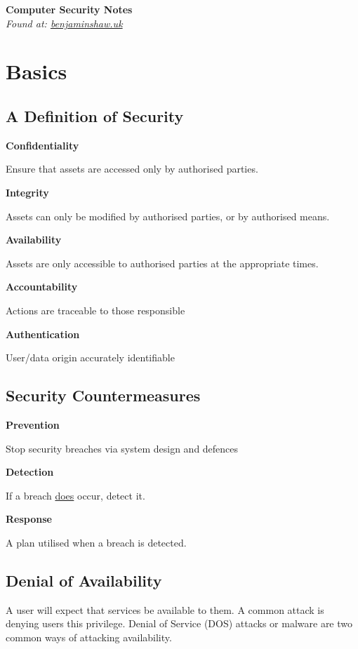 \documentclass{article}
\begin{document}
\textbf{\Huge Computer Security Notes}\\
\textit{\footnotesize Found at: \href{http://benjaminshaw.uk}{benjaminshaw.uk}}

\section{Basics}

\subsection{A Definition of Security}

\textbf{Confidentiality}

Ensure that assets are accessed only by authorised parties.

\textbf{Integrity}

Assets can only be modified by authorised parties, or by authorised
means.

\textbf{Availability}

Assets are only accessible to authorised parties at the appropriate
times.

\textbf{Accountability}

Actions are traceable to those responsible

\textbf{Authentication}

User/data origin accurately identifiable

\subsection{Security Countermeasures}
  
\textbf{Prevention}

Stop security breaches via system design and defences

\textbf{Detection}

If a breach \underline{does} occur, detect it.

\textbf{Response}

A plan utilised when a breach is detected.

\subsection{Denial of Availability}

A user will expect that services be available to them. A common attack
is denying users this privilege. Denial of Service (DOS) attacks or
malware are two common ways of attacking availability.
\end{document}

